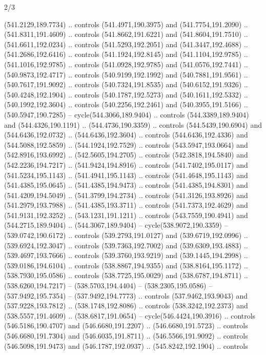 \begin{flagdescription}{2/3}
\begin{scope}[xshift=0.5\flaglength,yshift=0.5\flagwidth,scale=\flagwidth/495.65]
\begin{scope}[y=0.8pt, x=0.8pt, yscale=-1,shift={(-463.76,-309.78)}]
  (541.2129,189.7734) .. controls (541.4971,190.3975) and (541.7754,191.2090) ..
  (541.8311,191.4609) .. controls (541.8662,191.6221) and (541.8604,191.7510) ..
  (541.6611,192.0234) .. controls (541.5293,192.2051) and (541.3447,192.4688) ..
  (541.2686,192.6416) .. controls (541.1924,192.8145) and (541.1104,192.9785) ..
  (541.1016,192.9785) .. controls (541.0928,192.9785) and (541.0576,192.7441) ..
  (540.9873,192.4717) .. controls (540.9199,192.1992) and (540.7881,191.9561) ..
  (540.7617,191.9092) .. controls (540.7324,191.8535) and (540.6152,191.9326) ..
  (540.4248,192.1904) .. controls (540.1787,192.5273) and (540.1611,192.5332) ..
  (540.1992,192.3604) .. controls (540.2256,192.2461) and (540.3955,191.5166) ..
  (540.5947,190.7285) -- cycle(544.3066,189.9404) .. controls
  (544.3389,189.9404) and (544.4326,190.1191) .. (544.4736,190.3359) .. controls
  (544.5439,190.6904) and (544.6436,192.0732) .. (544.6436,192.3604) .. controls
  (544.6436,192.4336) and (544.5088,192.5859) .. (544.1924,192.7529) .. controls
  (543.5947,193.0664) and (542.8916,193.6992) .. (542.5605,194.2705) .. controls
  (542.3818,194.5840) and (542.2236,194.7217) .. (541.9424,194.8916) .. controls
  (541.7402,195.0117) and (541.5234,195.1143) .. (541.4941,195.1143) .. controls
  (541.4648,195.1143) and (541.4385,195.0645) .. (541.4385,194.9473) .. controls
  (541.4385,194.8301) and (541.4209,194.5049) .. (541.3799,194.2734) .. controls
  (541.3126,193.8926) and (541.2979,193.7988) .. (541.4385,193.3711) .. controls
  (541.7373,192.4629) and (541.9131,192.3252) .. (543.1231,191.1211) .. controls
  (543.7559,190.4941) and (544.2715,189.9404) .. (544.3067,189.9404) --
  cycle(538.9072,190.3359) -- (539.0742,190.6172) .. controls
  (539.2793,191.0127) and (539.6719,192.0996) .. (539.6924,192.3047) .. controls
  (539.7363,192.7002) and (539.6309,193.4883) .. (539.4697,193.7666) .. controls
  (539.3760,193.9219) and (539.1445,194.2998) .. (539.0186,194.6104) .. controls
  (538.8867,194.9355) and (538.8164,195.1172) .. (538.7930,195.0586) .. controls
  (538.7725,195.0029) and (538.6787,194.8711) .. (538.6260,194.7217) --
  (538.5703,194.4404) -- (538.2305,195.0586) -- (537.9492,195.7354) --
  (537.9492,194.7773) .. controls (537.9462,193.9043) and (537.9228,193.7812) ..
  (538.1748,192.8086) .. controls (538.3242,192.2373) and (538.5557,191.4609) ..
  (538.6817,191.0654) -- cycle(546.4424,190.3916) .. controls
  (546.5186,190.4707) and (546.6680,191.2207) .. (546.6680,191.5723) .. controls
  (546.6680,191.7304) and (546.6035,191.8711) .. (546.5566,191.9092) .. controls
  (546.5098,191.9473) and (546.1787,192.0937) .. (545.8242,192.1904) .. controls

\end{scope}
\end{scope}
\end{flagdescription}

